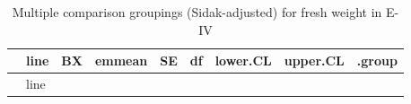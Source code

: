 \documentclass[
  10pt,
]{article}
\begin{document}
\begin{longtable}[]{@{}
  >{\raggedright\arraybackslash}p{}
  >{\raggedright\arraybackslash}p{}
  >{\raggedright\arraybackslash}p{}
  >{\raggedleft\arraybackslash}p{}
  >{\raggedleft\arraybackslash}p{}
  >{\raggedleft\arraybackslash}p{}
  >{\raggedleft\arraybackslash}p{}
  >{\raggedleft\arraybackslash}p{}
  >{\raggedright\arraybackslash}p{}@{}}
\caption{Multiple comparison groupings (Sidak-adjusted) for fresh weight
in E-IV}\tabularnewline
\toprule\noalign{}
\begin{minipage}[b]{\linewidth}\raggedright
\end{minipage} & \begin{minipage}[b]{\linewidth}\raggedright
line
\end{minipage} & \begin{minipage}[b]{\linewidth}\raggedright
BX
\end{minipage} & \begin{minipage}[b]{\linewidth}\raggedleft
emmean
\end{minipage} & \begin{minipage}[b]{\linewidth}\raggedleft
SE
\end{minipage} & \begin{minipage}[b]{\linewidth}\raggedleft
df
\end{minipage} & \begin{minipage}[b]{\linewidth}\raggedleft
lower.CL
\end{minipage} & \begin{minipage}[b]{\linewidth}\raggedleft
upper.CL
\end{minipage} & \begin{minipage}[b]{\linewidth}\raggedright
.group
\end{minipage} \\
\midrule\noalign{}
\endfirsthead
\toprule\noalign{}
\begin{minipage}[b]{\linewidth}\raggedright
\end{minipage} & \begin{minipage}[b]{\linewidth}\raggedright
line
\end{minipage} & \begin{minipage}[b]{\linewidth}\raggedright

\end{minipage}
\end{longtable}
\end{document}
